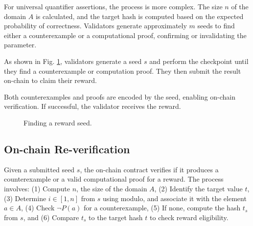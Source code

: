 \documentclass[runningheads]{llncs}
\begin{document}
For universal quantifier assertions, the process is more complex. The size \( n \) of the domain \( A \) is calculated, and the target hash is computed based on the expected probability of correctness. Validators generate approximately \( m \) seeds to find either a counterexample or a computational proof, confirming or invalidating the parameter.

As shown in Fig. \ref{fig:find_seed}, validators generate a seed \( s \) and perform the checkpoint until they find a counterexample or computation proof. They then submit the result on-chain to claim their reward.

Both counterexamples and proofs are encoded by the seed, enabling on-chain verification. If successful, the validator receives the reward.
\begin{figure}[t]
    \centering
{}
\caption{Finding a reward seed.}
\label{fig:find_seed}
\end{figure}
\subsection{On-chain Re-verification}
Given a submitted seed \( s \), the on-chain contract verifies if it produces a counterexample or a valid computational proof for a reward. The process involves: (1) Compute \( n \), the size of the domain \( A \), (2) Identify the target value \( t \), (3) Determine \( i \in [1, n] \) from \( s \) using modulo, and associate it with the element \( a \in A \), (4) Check \( \neg P(a) \) for a counterexample, (5) If none, compute the hash \( t_s \) from \( s \), and (6) Compare \( t_s \) to the target hash \( t \) to check reward eligibility.
\end{document}
